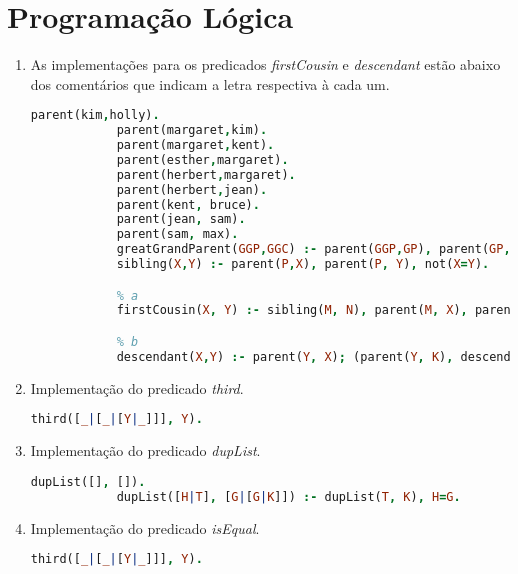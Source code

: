 \documentclass{article}
\begin{document}
\newpage

\section{Programação Lógica}

\begin{enumerate}
    \item

        As implementações para os predicados \textit{firstCousin} e \textit{descendant} estão abaixo dos comentários
        que indicam a letra respectiva à cada um.

        \begin{lstlisting}[language=Prolog]
            parent(kim,holly).
            parent(margaret,kim).
            parent(margaret,kent).
            parent(esther,margaret).
            parent(herbert,margaret).
            parent(herbert,jean).
            parent(kent, bruce).
            parent(jean, sam).
            parent(sam, max).
            greatGrandParent(GGP,GGC) :- parent(GGP,GP), parent(GP,P), parent(P,GGC).
            sibling(X,Y) :- parent(P,X), parent(P, Y), not(X=Y).

            % a
            firstCousin(X, Y) :- sibling(M, N), parent(M, X), parent(N, Y), not(X=Y), not(sibling(X, Y)).

            % b
            descendant(X,Y) :- parent(Y, X); (parent(Y, K), descendant(X, K)).
        \end{lstlisting}

    \item

        Implementação do predicado \textit{third}.

        \begin{lstlisting}[language=Prolog]
            third([_|[_|[Y|_]]], Y).
        \end{lstlisting}

    \item

        Implementação do predicado \textit{dupList}.    

        \begin{lstlisting}[language=Prolog]
            dupList([], []).
            dupList([H|T], [G|[G|K]]) :- dupList(T, K), H=G.
        \end{lstlisting}

    \item

        Implementação do predicado \textit{isEqual}.    

        \begin{lstlisting}[language=Prolog]
            third([_|[_|[Y|_]]], Y).
        \end{lstlisting}

\end{enumerate}
    
\end{document}
